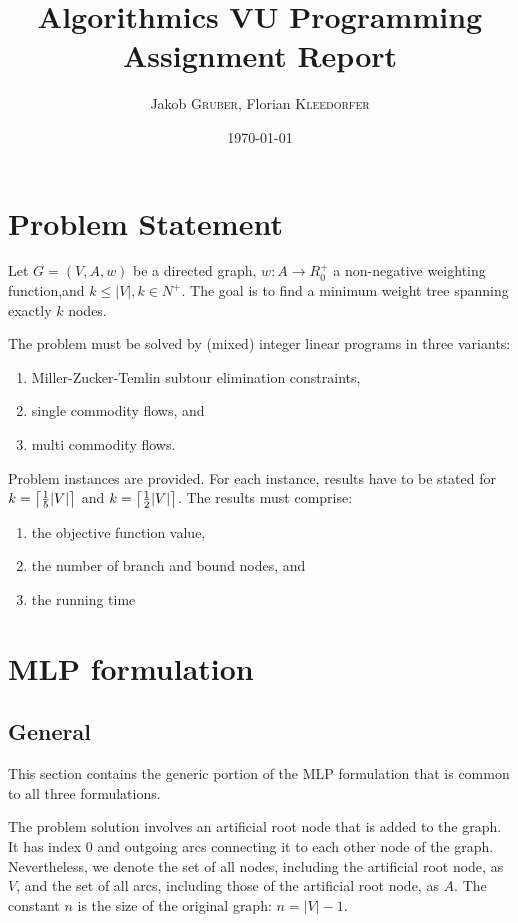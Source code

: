 \documentclass{article}
\title{Algorithmics VU Programming Assignment Report}
\author{Jakob \textsc{Gruber}, Florian \textsc{Kleedorfer}}
\date{\today}
\DeclarePairedDelimiter{\ceil}{\lceil}{\rceil}
\begin{document}
\maketitle

\section{Problem Statement}

Let $G=(V,A,w)$ be a directed graph, $w: A \rightarrow R_0^+$ a non-negative weighting function,and $k \leq |V|, k \in N^+$. The goal is to find a minimum weight tree spanning exactly $k$ nodes.

The problem must be solved by (mixed) integer linear programs in three variants:
\begin{enumerate}
	\item Miller-Zucker-Temlin subtour elimination constraints,
	\item single commodity flows, and
	\item multi commodity flows.
\end{enumerate}
Problem instances are provided. For each instance, results have to be stated for $k = \ceil[\big]{\frac{1}{5}|V|}$ and  $k = \ceil[\big]{\frac{1}{2}|V|}$. The results must comprise:
\begin{enumerate}
\item the objective function value,
\item the number of branch and bound nodes, and
\item the running time
\end{enumerate}

\section{MLP formulation} 
\subsection{General}
This section contains the generic portion of the MLP formulation that is common to all three formulations.

The problem solution involves an artificial root node that is added to the graph. It has index 0 and outgoing arcs connecting it to each other node of the graph. Nevertheless, we denote the set of all nodes, including the artificial root node, as $V$, and the set of all arcs, including those of the artificial root node, as $A$. The constant $n$ is the size of the original graph: $n = |V| - 1$.
\end{document}
